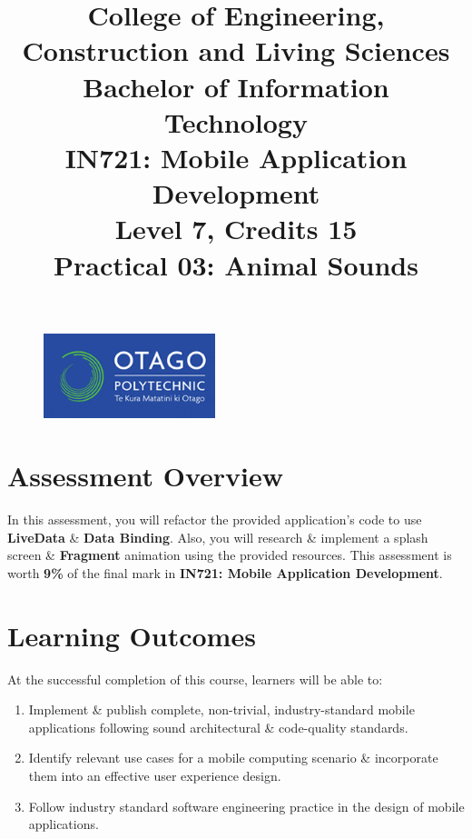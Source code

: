 \documentclass{article}
\author{}
\begin{document}
\begin{figure}
    \centering
    \includegraphics[width=50mm]{./img/logo.png}
\end{figure}

\title{College of Engineering, Construction and Living Sciences\\Bachelor of Information Technology\\IN721: Mobile Application Development\\Level 7, Credits 15\\\textbf{Practical 03: Animal Sounds}}
\date{}
\maketitle

\section*{Assessment Overview}
In this assessment, you will refactor the provided application's code to use \textbf{LiveData} \& \textbf{Data Binding}. Also, you will research \& implement a splash screen \& \textbf{Fragment} animation using the provided resources. This assessment is worth \textbf{9\%} of the final mark in \textbf{IN721: Mobile Application Development}.

\section*{Learning Outcomes}
At the successful completion of this course, learners will be able to: 
\begin{enumerate}
	\item Implement \& publish complete, non-trivial, industry-standard mobile applications following sound architectural \& code-quality standards.
	\item Identify relevant use cases for a mobile computing scenario \& incorporate them into an effective user experience design.
	\item Follow industry standard software engineering practice in the design of mobile applications.
\end{enumerate} 
\end{document}
